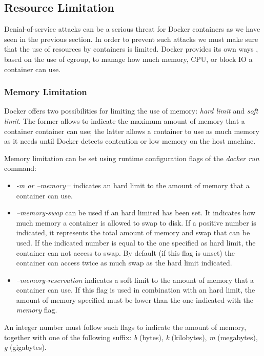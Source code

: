 \documentclass[a4paper,12pt]{article}
\begin{document}
\subsection{Resource Limitation}

Denial-of-service attacks can be a serious threat for Docker containers as we
have seen in the previous section. In order to prevent such attacks we must make
sure that the use of resources by containers is limited. Docker provides its own
ways \cite{docker_resource_limitation}, based on the use of cgroup, to manage
how much memory, CPU, or block IO a container can use.

\subsubsection{Memory Limitation}

Docker offers two possibilities for limiting the use of memory: \textit{hard
limit} and \textit{soft limit}. The former allows to indicate the maximum amount
of memory that a container container can use; the latter allows a container to
use as much memory as it needs until Docker detects contention or low memory on
the host machine. \par Memory limitation can be set using runtime configuration
flags of the \textit{docker run} command: 
\begin{itemize}
  \item \textit{-m or --memory=} indicates an hard limit to the amount
  of memory that a container can use.
  \item \textit{--memory-swap} can be used if an hard limited has been set. It
  indicates how much memory a container is allowed to swap to disk. If a
  positive number is indicated, it represents the total amount of memory and
  swap that can be used. If the indicated number is equal to the one specified
  as hard limit, the container can not access to swap. By default (if this flag is
  unset) the container can access twice as much swap as the hard limit indicated.
  \item \textit{--memory-reservation} indicates a soft limit to the amount
  of memory that a container can use. If this flag is used in combination with
  an hard limit, the amount of memory specified must be lower than the one
  indicated with the \textit{--memory} flag.
\end{itemize}
An integer number must follow such flags to indicate the amount of memory,
together with one of the following suffix: \textit{b} (bytes), \textit{k}
(kilobytes), \textit{m} (megabytes), \textit{g} (gigabytes).
  
\end{document}
